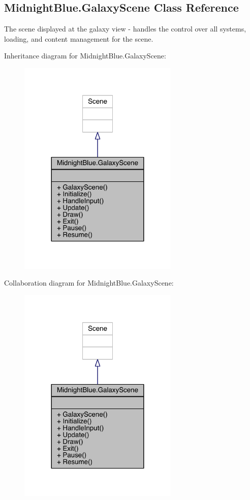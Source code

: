 \hypertarget{class_midnight_blue_1_1_galaxy_scene}{}\subsection{Midnight\+Blue.\+Galaxy\+Scene Class Reference}
\label{class_midnight_blue_1_1_galaxy_scene}


The scene displayed at the galaxy view -\/ handles the control over all systems, loading, and content management for the scene.  




Inheritance diagram for Midnight\+Blue.\+Galaxy\+Scene\+:\nopagebreak
\begin{figure}[H]
\begin{center}
\leavevmode
\includegraphics[width=216pt]{class_midnight_blue_1_1_galaxy_scene__inherit__graph}
\end{center}
\end{figure}


Collaboration diagram for Midnight\+Blue.\+Galaxy\+Scene\+:\nopagebreak
\begin{figure}[H]
\begin{center}
\leavevmode
\includegraphics[width=216pt]{class_midnight_blue_1_1_galaxy_scene__coll__graph}
\end{center}
\end{figure}
